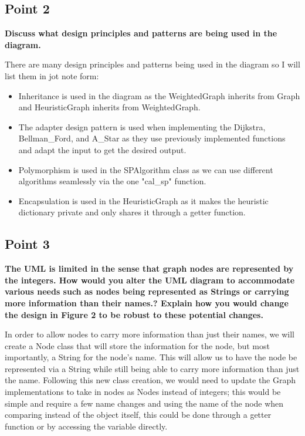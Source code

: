 \documentclass[12pt]{article}
\begin{document}
\subsection*{Point 2}
\textbf{Discuss what design principles and patterns are being used in the diagram.}

There are many design principles and patterns being used in the diagram so I will list them in jot note form:
\begin{itemize}
    \item Inheritance is used in the diagram as the WeightedGraph inherits from Graph and HeuristicGraph inherits from WeightedGraph.
    \item The adapter design pattern is used when implementing the Dijkstra, Bellman\_Ford, and A\_Star as they use previously implemented functions 
          and adapt the input to get the desired output.
    \item Polymorphism is used in the SPAlgorithm class as we can use different algorithms seamlessly via the one "cal\_sp" function.
    \item Encapsulation is used in the HeuristicGraph as it makes the heuristic dictionary private and only shares it through a getter function.
\end{itemize}

\subsection*{Point 3}
\textbf{The UML is limited in the sense that graph nodes are represented by the integers. How would you alter the UML diagram to accommodate various needs such as nodes being represented as Strings or carrying more information than their names.? Explain how you would change the design in Figure 2 to be robust to these potential changes.}

In order to allow nodes to carry more information than just their names, we will create a Node class that will store the information for the node, but most importantly, a String for the node's name. This will allow us to have the node be represented via a String while still being able to carry more information than just the name. Following this new class creation, we would need to update the Graph implementations to take in nodes as Nodes instead of integers; this would be simple and require a few name changes and using the name of the node when comparing instead of the object itself, this could be done through a getter function or by accessing the variable directly.
\end{document}
